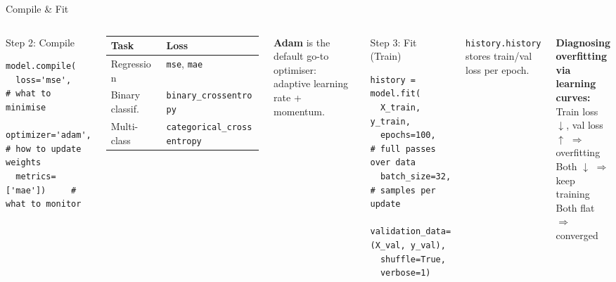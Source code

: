 \documentclass[aspectratio=169, 11pt]{beamer}
\begin{document}
%
%
\begin{frame}[fragile]{Compile \& Fit}

\begin{columns}[T]
\begin{block}{\small Step 2: Compile}
\begin{lstlisting}
model.compile(
  loss='mse',          # what to minimise
  optimizer='adam',     # how to update weights
  metrics=['mae'])     # what to monitor
\end{lstlisting}
\end{block}

\vspace{0.1cm}

\footnotesize
\renewcommand{\arraystretch}{1.1}
\begin{tabular}{@{}ll@{}}
\toprule
\textbf{Task} & \textbf{Loss} \\
\midrule
Regression & \texttt{mse}, \texttt{mae} \\
Binary classif. & \texttt{binary\_crossentropy} \\
Multi-class & \texttt{categorical\_crossentropy} \\
\bottomrule
\end{tabular}

\medskip

\textbf{Adam} is the default go-to optimiser: adaptive learning rate + momentum.

\begin{block}{\small Step 3: Fit (Train)}
\begin{lstlisting}
history = model.fit(
  X_train, y_train,
  epochs=100,          # full passes over data
  batch_size=32,       # samples per update
  validation_data=(X_val, y_val),
  shuffle=True,
  verbose=1)
\end{lstlisting}
\end{block}

\vspace{0.1cm}

\footnotesize
\texttt{history.history} stores train/val loss per epoch.

\medskip

\textbf{Diagnosing overfitting via learning curves:}\\
Train loss $\downarrow$, val loss $\uparrow$ $\Rightarrow$ overfitting\\
Both $\downarrow$ $\Rightarrow$ keep training\\
Both flat $\Rightarrow$ converged

\end{columns}

\end{frame}
\end{document}
